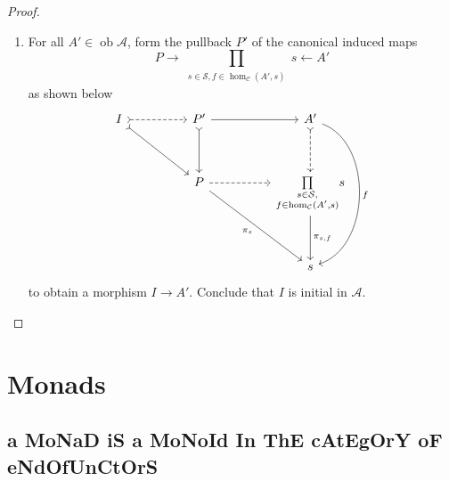 \documentclass[a4paper,11pt]{article}
\theoremstyle{break_italics}
\theoremstyle{break_upright}
\theoremstyle{remark}
\newcommand{\ob}{\operatorname{ob}}
\newcommand{\C}{\mathcal{C}}
\begin{document}
\begin{proof}
\begin{enumerate}
		\item For all $A' \in \ob\mathcal A$, form the pullback $P'$ of the canonical induced maps 
			\[
			P \rightarrow \prod_{\substack{s\in \mathcal S, f \in \hom_\C(A',s)}}s \leftarrow A'
			\]
			as shown below
			\[
\begin{tikzcd}
I \arrow[rr, dashed, tail] \arrow[rrdd, tail] &  & P' \arrow[dd, tail] \arrow[rr]              &  & A' \arrow[dd, dashed, tail] \arrow[dddd, "f", bend left=71] \\
                                              &  &                                             &  &                                                             \\
                                              &  & P \arrow[rr, dashed] \arrow[rrdd, "\pi_s"'] &  & {{\prod\limits_{\substack{s\in \mathcal S, \\ f \in \hom_\C(A',s)}}}s} \arrow[dd, "{\pi_{s,f}}"]                               \\
                                              &  &                                             &  &                                                             \\
                                              &  &                                             &  & s                                                          
\end{tikzcd}
			\]
			to obtain a morphism $I \to A'$. Conclude that $I$ is initial in $\mathcal A$. \qedhere
	\end{enumerate}
\end{proof}









\clearpage \newpage
\section{Monads}

\subsection{a MoNaD iS a MoNoId In ThE cAtEgOrY oF eNdOfUnCtOrS}
\end{document}
